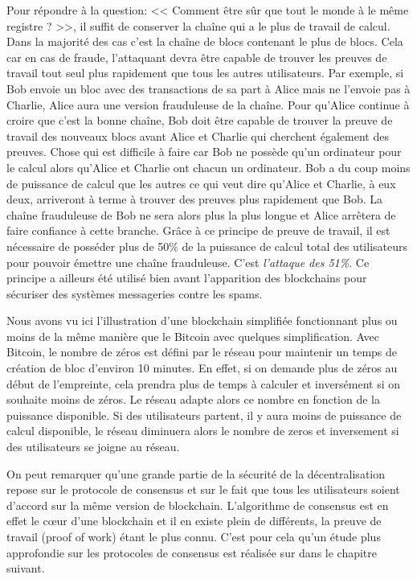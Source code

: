 Pour répondre à la question: << Comment être sûr que tout le monde à le même registre ? >>, il suffit de conserver la chaîne qui a le plus de travail de calcul. Dans la majorité des cas c'est la chaîne de blocs contenant le plus de blocs. Cela car en cas de fraude, l'attaquant devra être capable de trouver les preuves de travail tout seul plus rapidement que tous les autres utilisateurs. Par exemple, si Bob envoie un bloc avec des transactions de sa part à Alice mais ne l'envoie pas à Charlie, Alice aura une version frauduleuse de la chaîne. Pour qu'Alice continue à croire que c'est la bonne chaîne, Bob doit être capable de trouver la preuve de travail des nouveaux blocs avant Alice et Charlie qui cherchent également des preuves. Chose qui est difficile à faire car Bob ne possède qu'un ordinateur pour le calcul alors qu'Alice et Charlie ont chacun un ordinateur. Bob a du coup moins de puissance de calcul que les autres ce qui veut dire qu'Alice et Charlie, à eux deux, arriveront à terme à trouver des preuves plus rapidement que Bob. La chaîne frauduleuse de Bob ne sera alors plus la plus longue et Alice arrêtera de faire confiance à cette branche. Grâce à ce principe de preuve de travail, il est nécessaire de posséder plus de 50\% de la puissance de calcul total des utilisateurs pour pouvoir émettre une chaîne frauduleuse. C'est \emph{l'attaque des 51\%}. Ce principe a ailleurs été utilisé bien avant l'apparition des blockchains pour sécuriser des systèmes messageries contre les spams.

Nous avons vu ici l'illustration d'une blockchain simplifiée fonctionnant plus ou moins de la même manière que le Bitcoin avec quelques simplification. Avec Bitcoin, le nombre de zéros est défini par le réseau pour maintenir un temps de création de bloc d'environ 10 minutes. En effet, si on demande plus de zéros au début de l'empreinte, cela prendra plus de temps à calculer et inversément si on souhaite moins de zéros. Le réseau adapte alors ce nombre en fonction de la puissance disponible. Si des utilisateurs partent, il y aura moins de puissance de calcul disponible, le réseau diminuera alors le nombre de zeros et inversement si des utilisateurs se joigne au réseau.

On peut remarquer qu'une grande partie de la sécurité de la décentralisation repose sur le protocole de consensus et sur le fait que tous les utilisateurs soient d'accord sur la même version de blockchain. L'algorithme de consensus est en effet le cœur d'une blockchain et il en existe plein de différents, la preuve de travail (proof of work) étant le plus connu. C'est pour cela qu'un étude plus approfondie sur les protocoles de consensus est réalisée sur dans le chapitre suivant.
